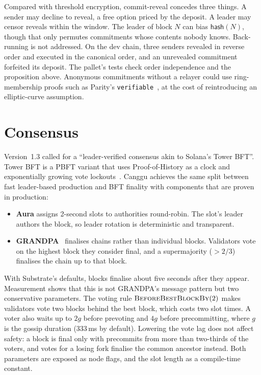 \documentclass[11pt]{article}
\theoremstyle{definition}
\theoremstyle{remark}
\begin{document}
Compared with threshold encryption, commit-reveal concedes three things. A sender may decline to
reveal, a free option priced by the deposit. A leader may censor reveals within the window. The
leader of block $N$ can bias $\mathsf{hash}(N)$, though that only permutes commitments whose
contents nobody knows. Back-running is not addressed. On the dev chain, three senders revealed in
reverse order and executed in the canonical order, and an unrevealed commitment forfeited its
deposit. The pallet's tests check order independence and the proposition above. Anonymous
commitments without a relayer could use ring-membership proofs such as Parity's
\texttt{verifiable}~\cite{verifiable}, at the cost of reintroducing an elliptic-curve
assumption.

\section{Consensus}
\label{sec:consensus}

Version~1.3 called for a ``leader-verified consensus akin to Solana's Tower BFT''. Tower BFT is a
PBFT variant that uses Proof-of-History as a clock and exponentially growing vote
lockouts~\cite{solana2020whitepaper}. Canggu achieves the same split between fast leader-based
production and BFT finality with components that are proven in production:
\begin{itemize}[leftmargin=*]
  \item \textbf{Aura} assigns 2-second slots to authorities round-robin. The slot's leader authors
        the block, so leader rotation is deterministic and transparent.
  \item \textbf{GRANDPA}~\cite{grandpa} finalises chains rather than individual blocks. Validators
        vote on the highest block they consider final, and a supermajority ($>2/3$) finalises the
        chain up to that block.
\end{itemize}
With Substrate's defaults, blocks finalise about five seconds after they appear. Measurement shows
that this is not GRANDPA's message pattern but two conservative parameters. The voting rule
$\textsc{BeforeBestBlockBy}(2)$ makes validators vote two blocks behind the best block, which costs
two slot times. A voter also waits up to $2g$ before prevoting and $4g$ before precommitting, where
$g$ is the gossip duration (333\,ms by default). Lowering the vote lag does not affect safety: a
block is final only with precommits from more than two-thirds of the voters, and votes for a
losing fork finalise the common ancestor instead. Both parameters are exposed as node flags, and
the slot length as a compile-time constant.
\end{document}
